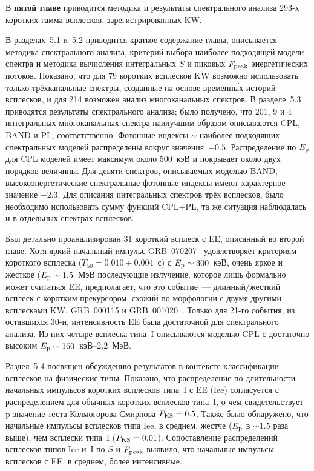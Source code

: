 В \underline{\textbf{пятой главе}} приводится методика и результаты спектрального 
анализа 293-х коротких гамма-всплесков, зарегистрированных KW.

В разделах~5.1 и~5.2 приводится краткое содержание главы, 
описывается методика спектрального анализа, критерий выбора наиболее подходящей модели спектра
и методика вычисления интегральных $S$ и пиковых $F_{\mathrm{peak}}$ энергетических потоков. 
Показано, что для 79 коротких всплесков KW возможно использовать только трёхканальные спектры, 
созданные на основе временн\'{ы}х историй всплесков, и для 214 возможен анализ многоканальных спектров.
В разделе~5.3 приводятся результаты спектрального анализа; было получено, что 201, 9 и 4 интегральных 
многоканальных спектра наилучшим образом описываются CPL, BAND и PL, соответственно. 
Фотонные индексы $\alpha$ наиболее подходящих спектральных моделей распределены 
вокруг значения~$-0.5$. Распределение по $E_{\mathrm{p}}$ для CPL моделей имеет максимум около 500~кэВ 
и покрывает около двух порядков величины. Для девяти спектров, описываемых моделью BAND,
высокоэнергетические спектральные фотонные индексы имеют характерное значение $-2.3$.
Для описания интегральных спектров трёх всплесков, было необходимо использовать сумму функций 
CPL+PL, та же ситуация наблюдалась и в отдельных спектрах всплесков. 


Был детально проанализирован 31 короткий всплеск с EE, описанный во второй главе.
Хотя яркий начальный импульс GRB~070207~\citep{Golenetskii_2007GCN6089}
удовлетворяет критериям короткого всплеска ($T_{50}=0.010\pm0.004$~с) с $E_{\mathrm{p}}\sim 300$~кэВ,
очень яркое и жесткое ($E_{\mathrm{p}}\sim 1.5$~МэВ последующие излучение, которое лишь формально может
считаться EE, предполагает, что это событие~--- длинный/жесткий всплеск с коротким прекурсором,
схожий по морфологии с двумя другими всплесками KW, GRB~000115 
и GRB~001020~\citep{Hurley_2000GCN859}. 
Только для 21-го события, из оставшихся 30-и, интенсивность EE была достаточной 
для спектрального анализа. Из них четыре всплеска типа~I описываются моделью CPL с 
достаточно высоким $E_{\mathrm{p}} \sim 160$~кэВ--2.2~МэВ.

Раздел~5.4 посвящен обсуждению результатов в контексте классификации всплесков на физические типы.
Показано, что распределение по длительности начальных импульсов коротких всплесков 
типа~I с EE (Iee) согласуется с распределением для обычных коротких всплесков типа~I, 
о чем свидетельствует p-значение теста Колмогорова-Смирнова $P_{\mathrm{KS}}=0.5$. 
Также было обнаружено, что начальные импульсы всплесков типа Iee, в среднем, 
жестче ($E_{\mathrm{p}}$ в $\sim 1.5$ раза выше), чем всплески типа~I ($P_{\mathrm{KS}} = 0.01$). 
Сопоставление распределений 
всплесков типов Iee и~I по $S$ и $F_{\mathrm{peak}}$ выявило, что начальные импульсы 
всплесков с EE, в среднем, более интенсивные. 

